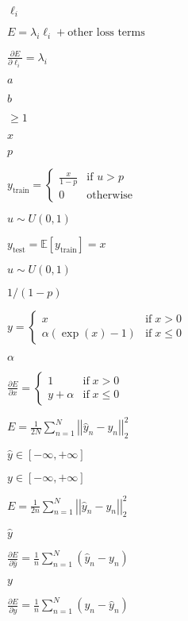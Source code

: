 \documentclass{article}
\begin{document}
$\ell_i$
\pagebreak

$ E = \lambda_i \ell_i + \mbox{other loss terms}$
\pagebreak

$ \frac{\partial E}{\partial \ell_i} = \lambda_i $
\pagebreak

$a$
\pagebreak

$b$
\pagebreak

$ \geq 1 $
\pagebreak

$x$
\pagebreak

$ p $
\pagebreak

$ y_{\mbox{train}} = \left\{ \begin{array}{ll} \frac{x}{1 - p} & \mbox{if } u > p \\ 0 & \mbox{otherwise} \end{array} \right. $
\pagebreak

$ u \sim U(0, 1)$
\pagebreak

$ y_{\mbox{test}} = \mathbb{E}[y_{\mbox{train}}] = x $
\pagebreak

$u\sim U(0,1)$
\pagebreak

$ 1 / (1 - p) $
\pagebreak

$ y = \left\{ \begin{array}{lr} x & \mathrm{if} \; x > 0 \\ \alpha (\exp(x)-1) & \mathrm{if} \; x \le 0 \end{array} \right. $
\pagebreak

$ \alpha $
\pagebreak

$ \frac{\partial E}{\partial x} = \left\{ \begin{array}{lr} 1 & \mathrm{if} \; x > 0 \\ y + \alpha & \mathrm{if} \; x \le 0 \end{array} \right. $
\pagebreak

$ E = \frac{1}{2N} \sum\limits_{n=1}^N \left| \left| \hat{y}_n - y_n \right| \right|_2^2 $
\pagebreak

$ \hat{y} \in [-\infty, +\infty]$
\pagebreak

$ y \in [-\infty, +\infty]$
\pagebreak

$ E = \frac{1}{2n} \sum\limits_{n=1}^N \left| \left| \hat{y}_n - y_n \right| \right|_2^2 $
\pagebreak

$\hat{y}$
\pagebreak

$ \frac{\partial E}{\partial \hat{y}} = \frac{1}{n} \sum\limits_{n=1}^N (\hat{y}_n - y_n) $
\pagebreak

$y$
\pagebreak

$ \frac{\partial E}{\partial y} = \frac{1}{n} \sum\limits_{n=1}^N (y_n - \hat{y}_n) $
\pagebreak
\end{document}
